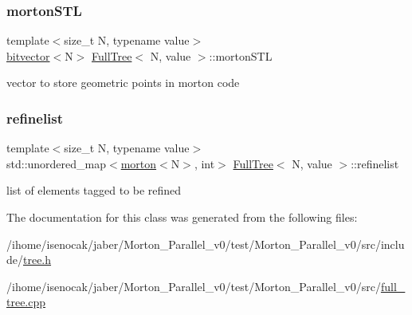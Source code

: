 \subsubsection{\texorpdfstring{morton\+S\+TL}{mortonSTL}}
{\footnotesize\ttfamily template$<$size\+\_\+t N, typename value$>$ \\
\mbox{\hyperlink{definitions_8h_a55821d7929f3f16aaf1466129c209492}{bitvector}}$<$N$>$ \mbox{\hyperlink{classFullTree}{Full\+Tree}}$<$ N, value $>$\+::morton\+S\+TL\hspace{0.3cm}{\ttfamily [private]}}

vector to store geometric points in morton code \mbox{\label{classFullTree_aa4cfcbc1c6029ecd353759159a8d8844}} 
\subsubsection{\texorpdfstring{refinelist}{refinelist}}
{\footnotesize\ttfamily template$<$size\+\_\+t N, typename value$>$ \\
std\+::unordered\+\_\+map$<$\mbox{\hyperlink{definitions_8h_af8682350bd8bb38ee9023f7a0a310add}{morton}}$<$N$>$, int$>$ \mbox{\hyperlink{classFullTree}{Full\+Tree}}$<$ N, value $>$\+::refinelist\hspace{0.3cm}{\ttfamily [private]}}

list of elements tagged to be refined 

The documentation for this class was generated from the following files\+:\begin{DoxyCompactItemize}
\item 
/ihome/isenocak/jaber/\+Morton\+\_\+\+Parallel\+\_\+v0/test/\+Morton\+\_\+\+Parallel\+\_\+v0/src/include/\mbox{\hyperlink{tree_8h}{tree.\+h}}\item 
/ihome/isenocak/jaber/\+Morton\+\_\+\+Parallel\+\_\+v0/test/\+Morton\+\_\+\+Parallel\+\_\+v0/src/\mbox{\hyperlink{full__tree_8cpp}{full\+\_\+tree.\+cpp}}\end{DoxyCompactItemize}
